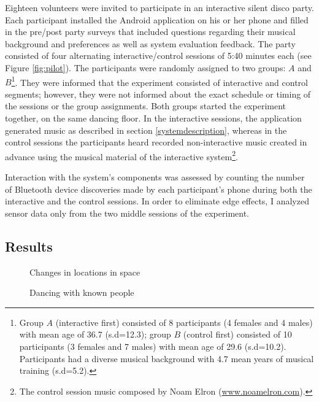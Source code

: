 \documentclass[a4paper,11pt]{article}
\begin{document}
{Eighteen volunteers were invited to participate in an interactive silent disco party.
Each participant installed the Android application on his or her phone and filled in the pre/post party surveys that included questions regarding their musical background and preferences as well as system evaluation feedback.
The party consisted of four alternating interactive/control sessions of 5:40 minutes each (see Figure \ref{fig:pilot}).
The participants were randomly assigned to two groups: $A$ and $B$\footnote{Group $A$ (interactive first) consisted of 8 participants (4 females and 4 males) with mean age of 36.7 (s.d=12.3); group $B$ (control first) consisted of 10 participants (3 females and 7 males) with mean age of 29.6 (s.d=10.2). Participants had a diverse musical background with 4.7 mean years of musical training (s.d=5.2).}.
They were informed that the experiment consisted of interactive and control segments;
however, they were not informed about the exact schedule or timing of the sessions or the group assignments.
Both groups started the experiment together, on the same dancing floor.
In the interactive sessions, the application generated music as described in section \ref{systemdescription}, whereas in the control sessions the participants heard recorded non-interactive music created in advance using the musical material of the interactive system\footnote{The control session music composed by Noam Elron (\href{http://www.noamelron.com}{www.noamelron.com}).}.

Interaction with the system's components was assessed by counting the number of Bluetooth device discoveries made by each participant's phone during both the interactive and the control sessions.
In order to eliminate edge effects, I analyzed sensor data only from the two middle sessions of the experiment.

\subsection{Results}

\begin{figure}[!htb]
	\def\svgwidth{0.95\columnwidth}
  	
	\caption{Changes in locations in space}\label{fig:location}
\endminipage\hfill
{}
	\def\svgwidth{0.95\columnwidth}
	
	\caption{Dancing with known people}\label{fig:known}
\endminipage\hfill
\end{figure}

}
\end{document}
